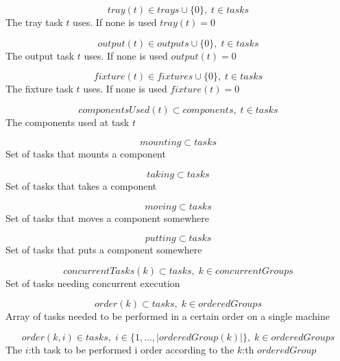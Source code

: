 \documentclass[10pt,a4paper]{report}
\begin{document}
\begin{equation}\label{eq:22}
tray(t) \in trays \cup \{0\}, \; t \in tasks\end{equation}
The tray task $t$ uses. If none is used $tray(t) = 0$

\begin{equation}\label{eq:23}
output(t) \in outputs \cup \{0\}, \; t \in tasks\end{equation}
The output task $t$ uses. If none is used $output(t) = 0$

\begin{equation}\label{eq:24}
fixture(t) \in fixtures \cup \{0\}, \; t \in tasks\end{equation}
The fixture task $t$ uses. If none is used $fixture(t) = 0$

\begin{equation}\label{eq:25}
componentsUsed(t) \subset components, \; t \in tasks\end{equation}
The components used at task $t$

\begin{equation}\label{eq:26}
mounting \subset tasks\end{equation}
Set of tasks that mounts a component

\begin{equation}\label{eq:27}
taking \subset tasks\end{equation}
Set of tasks that takes a component

\begin{equation}\label{eq:28}
moving \subset tasks\end{equation}
Set of tasks that moves a component somewhere

\begin{equation}\label{eq:29}
putting \subset tasks\end{equation}
Set of tasks that puts a component somewhere

\begin{equation}\label{eq:30}
concurrentTasks(k) \subset tasks, \; k \in concurrentGroups\end{equation}
Set of tasks needing concurrent execution

\begin{equation}\label{eq:31}
order(k) \subset tasks, \; k \in orderedGroups
\end{equation} 
Array of tasks needed to be performed in a certain order on a single machine

\begin{equation}\label{eq:32}
order(k,i) \in tasks, \; i \in \{1 , \ldots , |orderedGroup(k)|\}, \; k \in orderedGroups
\end{equation}
The $i$:th task to be performed i order according to the $k$:th $orderedGroup$
\end{document}
